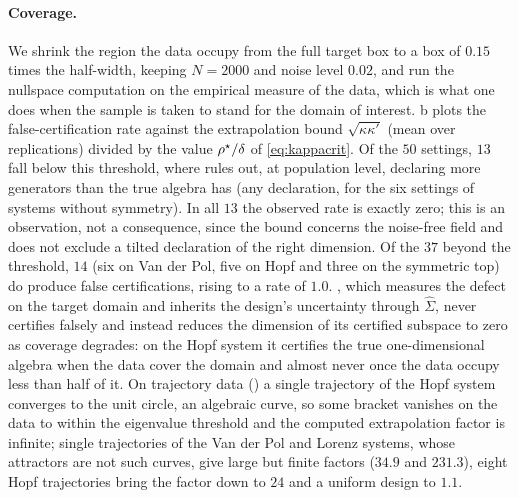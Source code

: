 \paragraph{Coverage.} We shrink the region the data occupy from the full target
box to a box of $0.15$ times the half-width, keeping $N=2000$ and noise level
$0.02$, and run the nullspace computation on the empirical measure of the data,
which is what one does when the sample is taken to stand for the domain of
interest. b plots the false-certification rate against the
extrapolation bound $\sqrt{\kappa\kappa'}$ (mean over replications) divided by
the value $\rho^\star/\delta$ of \eqref{eq:kappacrit}. Of the $50$ settings,
$13$ fall below this threshold, where  rules out, at
population level, declaring more generators than the true algebra has (any
declaration, for the six settings of systems without symmetry). In all $13$ the
observed rate is exactly zero; this is an observation, not a consequence, since
the bound concerns the noise-free field and does not exclude a tilted
declaration of the right dimension. Of the $37$ beyond the threshold, $14$ (six
on Van der Pol, five on Hopf and three on the symmetric top) do produce false
certifications, rising to a rate of $1.0$. \symcert{}, which measures the
defect on the target domain and inherits the design's uncertainty through
$\hat\Sigma$, never certifies falsely and instead reduces the dimension of its
certified subspace to zero as coverage degrades: on the Hopf system it
certifies the true one-dimensional algebra when the data cover the domain and
almost never once the data occupy less than half of it. On trajectory data
(\STtrajectory) a single trajectory of the Hopf system converges to the unit
circle, an algebraic curve, so some bracket vanishes on the data to within the
eigenvalue threshold and the computed extrapolation factor is infinite; single
trajectories of the Van der Pol and Lorenz systems, whose attractors are not
such curves, give large but finite factors ($34.9$ and $231.3$), eight Hopf
trajectories bring the factor down to $24$ and a uniform design to $1.1$.

